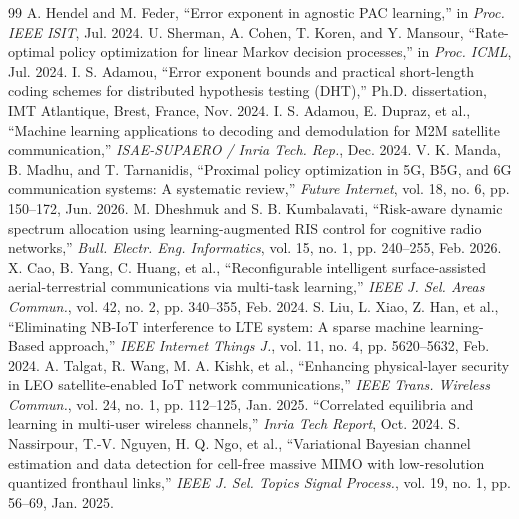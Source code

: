 \documentclass[journal]{IEEEtran}
\begin{document}
\begin{thebibliography}{99}
 A. Hendel and M. Feder, ``Error exponent in agnostic PAC learning,'' in \emph{Proc. IEEE ISIT}, Jul. 2024.
 U. Sherman, A. Cohen, T. Koren, and Y. Mansour, ``Rate-optimal policy optimization for linear Markov decision processes,'' in \emph{Proc. ICML}, Jul. 2024.
 I. S. Adamou, ``Error exponent bounds and practical short-length coding schemes for distributed hypothesis testing (DHT),'' Ph.D. dissertation, IMT Atlantique, Brest, France, Nov. 2024.
 I. S. Adamou, E. Dupraz, et al., ``Machine learning applications to decoding and demodulation for M2M satellite communication,'' \emph{ISAE-SUPAERO / Inria Tech. Rep.}, Dec. 2024.
 V. K. Manda, B. Madhu, and T. Tarnanidis, ``Proximal policy optimization in 5G, B5G, and 6G communication systems: A systematic review,'' \emph{Future Internet}, vol. 18, no. 6, pp. 150--172, Jun. 2026.
 M. Dheshmuk and S. B. Kumbalavati, ``Risk-aware dynamic spectrum allocation using learning-augmented RIS control for cognitive radio networks,'' \emph{Bull. Electr. Eng. Informatics}, vol. 15, no. 1, pp. 240--255, Feb. 2026.
 X. Cao, B. Yang, C. Huang, et al., ``Reconfigurable intelligent surface-assisted aerial-terrestrial communications via multi-task learning,'' \emph{IEEE J. Sel. Areas Commun.}, vol. 42, no. 2, pp. 340--355, Feb. 2024.
 S. Liu, L. Xiao, Z. Han, et al., ``Eliminating NB-IoT interference to LTE system: A sparse machine learning-Based approach,'' \emph{IEEE Internet Things J.}, vol. 11, no. 4, pp. 5620--5632, Feb. 2024.
 A. Talgat, R. Wang, M. A. Kishk, et al., ``Enhancing physical-layer security in LEO satellite-enabled IoT network communications,'' \emph{IEEE Trans. Wireless Commun.}, vol. 24, no. 1, pp. 112--125, Jan. 2025.
 ``Correlated equilibria and learning in multi-user wireless channels,'' \emph{Inria Tech Report}, Oct. 2024.
 S. Nassirpour, T.-V. Nguyen, H. Q. Ngo, et al., ``Variational Bayesian channel estimation and data detection for cell-free massive MIMO with low-resolution quantized fronthaul links,'' \emph{IEEE J. Sel. Topics Signal Process.}, vol. 19, no. 1, pp. 56--69, Jan. 2025.


\end{thebibliography}
\end{document}
